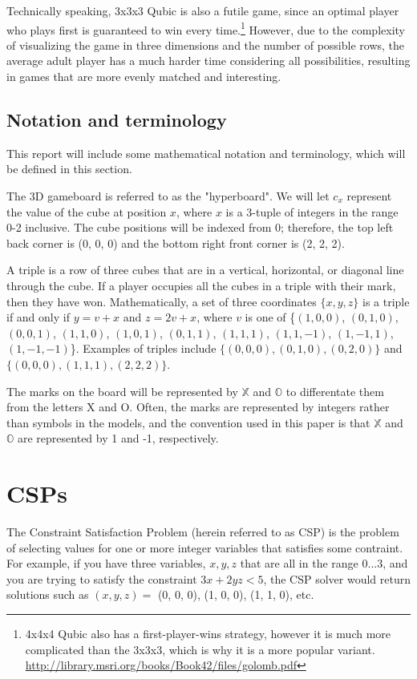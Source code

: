 \documentclass[11pt]{article}
\newcommand{\XX}{$\mathbb{X}$ }
\newcommand{\OO}{$\mathbb{O}$ }
\begin{document}

Technically speaking, 3x3x3 Qubic is also a futile game, since an optimal player who plays first is guaranteed to win every time.\footnote{4x4x4 Qubic also has a first-player-wins strategy, however it is much more complicated than the 3x3x3, which is why it is a more popular variant. \url{http://library.msri.org/books/Book42/files/golomb.pdf}} However, due to the complexity of visualizing the game in three dimensions and the number of possible rows, the average adult player has a much harder time considering all possibilities, resulting in games that are more evenly matched and interesting.

\subsection{Notation and terminology}
This report will include some mathematical notation and terminology, which will be defined in this section. 

The 3D gameboard is referred to as the "hyperboard". We will let $c_{x}$ represent the value of the cube at position $x$, where $x$ is a 3-tuple of integers in the range 0-2 inclusive. The cube positions will be indexed from 0; therefore, the top left back corner is (0, 0, 0) and the bottom right front corner is (2, 2, 2).

A triple is a row of three cubes that are in a vertical, horizontal, or diagonal line through the cube. If a player occupies all the cubes in a triple with their mark, then they have won. Mathematically, a set of three coordinates $\{x, y, z\}$ is a triple if and only if $y = v + x$ and $z = 2v + x$, where $v$ is one of \{$(1, 0, 0)$, $(0, 1, 0)$, $(0, 0, 1)$, $(1, 1, 0)$, $(1, 0, 1)$, $(0, 1, 1)$, $(1, 1, 1)$, $(1, 1, -1)$, $(1, -1, 1)$, $(1, -1, -1)$\}. Examples of triples include $\{(0, 0, 0), (0, 1, 0), (0, 2, 0)\}$ and $\{(0, 0, 0), (1, 1, 1), (2, 2, 2)\}$.

The marks on the board will be represented by \XX and \OO to differentate them from the letters X and O. Often, the marks are represented by integers rather than symbols in the models, and the convention used in this paper is that \XX and \OO are represented by 1 and -1, respectively.



\section{CSPs}
The Constraint Satisfaction Problem (herein referred to as CSP) is the problem of selecting values for one or more integer variables that satisfies some contraint. For example, if you have three variables, $x, y, z$ that are all in the range $0...3$, and you are trying to satisfy the constraint $3x + 2yz < 5$, the CSP solver would return solutions such as $(x,y,z) = $ (0, 0, 0), (1, 0, 0), (1, 1, 0), etc.
\end{document}
